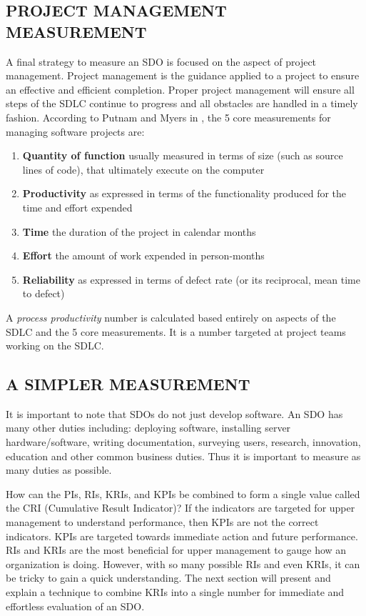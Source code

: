 \documentclass[SDSUThesis.tex]{subfiles}
\begin{document}
    \subsection{PROJECT MANAGEMENT MEASUREMENT}
    \label{sec:pm}
        A final strategy to measure an SDO is focused on the aspect of
        project management. Project management is the guidance
        applied to a project to ensure an effective and efficient
        completion.  Proper project management will ensure all steps
        of the SDLC
        continue to progress and all obstacles are handled
        in a timely fashion.  
        According to Putnam and Myers in \cite{Putnam2013}, 
        the 5 core measurements for managing software
        projects are:
        
        \begin{enumerate}
            \item \textbf{Quantity of function} usually measured in terms of size (such as source lines of code), that ultimately execute on the computer
            \item \textbf{Productivity} as expressed in terms of the functionality produced for the time and effort expended
            \item \textbf{Time} the duration of the project in calendar months
            \item \textbf{Effort} the amount of work expended in person-months
            \item \textbf{Reliability} as expressed in terms of defect rate (or its reciprocal, mean time to defect)
        \end{enumerate}
        
        A \textit{process productivity} number is calculated based entirely
        on aspects of the SDLC and the 5 core measurements.  It is a number
        targeted at project teams working on the SDLC.  
       
    \subsection{A SIMPLER MEASUREMENT}
    
        It is important to note that SDOs do not just
        develop software.  An SDO has many other duties
        including: deploying software, installing server hardware/software,
        writing documentation, surveying users, research, innovation,
        education and other common business duties.  Thus it is
        important to measure as many duties as possible.  
    
        How can the PIs, RIs, KRIs, and KPIs be combined to form a single
        value called the CRI (Cumulative Result Indicator)?  If the indicators
        are targeted for upper management to understand performance, then 
        KPIs are not the correct indicators.  KPIs are targeted towards
        immediate action and future performance.  RIs and KRIs are the most
        beneficial for upper management to gauge how an organization is doing.
        However, with so many possible RIs and even KRIs, it can be tricky
        to gain a quick understanding.  The next section will present
        and explain a technique to combine KRIs into a single number
        for immediate and  effortless evaluation of an SDO.
        
\end{document}
